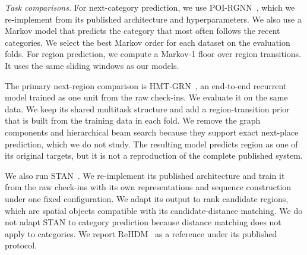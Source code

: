 \emph{Task comparisons.} For next-category prediction, we use POI-RGNN~\cite{capanema2023poirgnn}, which we re-implement from its published architecture and hyperparameters. We also use a Markov model that predicts the category that most often follows the recent categories. We select the best Markov order for each dataset on the evaluation folds. For region prediction, we compute a Markov-1 floor over region transitions. It uses the same sliding windows as our models.

The primary next-region comparison is HMT-GRN~\cite{Lim2022}, an end-to-end recurrent model trained as one unit from the raw check-ins. We evaluate it on the same data. We keep its shared multitask structure and add a region-transition prior that is built from the training data in each fold. We remove the graph components and hierarchical beam search because they support exact next-place prediction, which we do not study. The resulting model predicts region as one of its original targets, but it is not a reproduction of the complete published system.

We also run STAN~\cite{luo2021stan}. We re-implement its published architecture and train it from the raw check-ins with its own representations and sequence construction under one fixed configuration. We adapt its output to rank candidate regions, which are spatial objects compatible with its candidate-distance matching. We do not adapt STAN to category prediction because distance matching does not apply to categories. We report ReHDM~\cite{li2025rehdm} as a reference under its published protocol.

